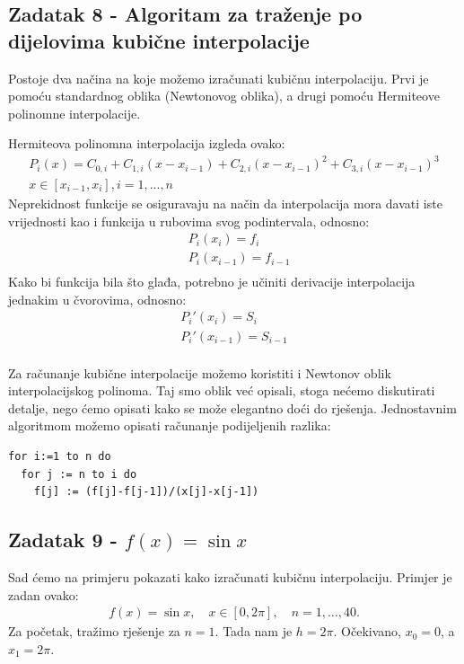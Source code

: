 \documentclass[12pt,a4paper]{report}
\begin{document}
		\subsection{Zadatak 8 - Algoritam za traženje po dijelovima kubične interpolacije}
		Postoje dva načina na koje možemo izračunati kubičnu interpolaciju. Prvi je pomoću standardnog oblika (Newtonovog oblika), a drugi pomoću Hermiteove polinomne interpolacije.
		
		Hermiteova polinomna interpolacija izgleda ovako:
		\begin{align*}
		P_i(x)=C_{0,i}+C_{1,i}(x-x_{i-1})+C_{2,i}(x-x_{i-1})^2+C_{3,i}(x-x_{i-1})^3 \\
		x\in[x_{i-1}, x_i], i=1,...,n
		\end{align*}
		Neprekidnost funkcije se osiguravaju na način da interpolacija mora davati iste vrijednosti kao i funkcija u rubovima svog podintervala, odnosno:
		\begin{align*}
			&P_i(x_i)=f_i\\
			&P_i(x_{i-1})=f_{i-1}\\
		\end{align*}
		Kako bi funkcija bila što glađa, potrebno je učiniti derivacije interpolacija jednakim u čvorovima, odnosno:
		\begin{align*}
		P_i'(x_i)=S_i\\
		P_i'(x_{i-1})=S_{i-1}\\
		\end{align*}
		
		
		Za računanje kubične interpolacije možemo koristiti i Newtonov oblik interpolacijskog polinoma. Taj smo oblik već opisali, stoga nećemo diskutirati detalje, nego ćemo opisati kako se može elegantno doći do rješenja. Jednostavnim algoritmom možemo opisati računanje podijeljenih razlika:
		\begin{lstlisting}
for i:=1 to n do
  for j := n to i do
    f[j] := (f[j]-f[j-1])/(x[j]-x[j-1])
		\end{lstlisting}


		\subsection{Zadatak 9 - $f(x)=\sin x$}
		Sad ćemo na primjeru pokazati kako izračunati kubičnu interpolaciju. Primjer je zadan ovako:
		\begin{align*}
			f(x)=\sin x, \quad x\in [0, 2\pi], \quad n=1,\ldots,40.
		\end{align*}
		Za početak, tražimo rješenje za $n=1$. Tada nam je $h=2\pi$. Očekivano, $x_0 = 0$, a $x_1 = 2\pi$.  
		
\end{document}
